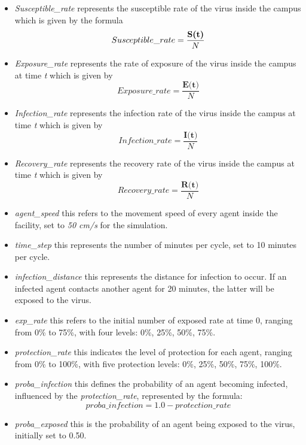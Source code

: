 \begin{itemize}
 	\item \textit{Susceptible\_rate} represents the susceptible rate of the virus inside the campus which is given by the formula
 	\[
 	Susceptible\_rate = \frac{\textbf{\textbf{S(t)}}}{N}
 	\]
 	\item \textit{Exposure\_rate} represents the rate of exposure of the virus inside the campus at time \textit{t} which is given by
 	\[
 	Exposure\_rate = \frac{\textbf{E(t)}}{N}
 	\]
 	\item \textit{Infection\_rate} represents the infection rate of the virus inside the campus at time \textit{t} which is given by
 	\[
 	Infection\_rate = \frac{\textbf{I(t)}}{N}
 	\]
 	\item \textit{Recovery\_rate} represents the recovery rate of the virus inside the campus at time \textit{t} which is given by
 	\begin{equation*}
 		Recovery\_rate = \frac{\textbf{R(t)}}{N}
 	\end{equation*}
 	
 	\item \textit{agent\_speed} this refers to the movement speed of every agent inside the facility, set to \textit{50 cm/s} for the simulation.
 	
 	\item \textit{time\_step} this represents the number of minutes per cycle, set to 10 minutes per cycle.
 	
 	\item \textit{infection\_distance} this represents the distance for infection to occur. If an infected agent contacts another agent for 20 minutes, the latter will be exposed to the virus.
 	
 	\item \textit{exp\_rate} this refers to the initial number of exposed rate at time 0, ranging from 0\% to 75\%, with four levels: 0\%, 25\%, 50\%, 75\%.
 	
 	\item \textit{protection\_rate} this indicates the level of protection for each agent, ranging from 0\% to 100\%, with five protection levels: 0\%, 25\%, 50\%, 75\%, 100\%.
 	
 
 	
 	\item \textit{proba\_infection} this defines the probability of an agent becoming infected, influenced by the \textit{protection\_rate}, represented by the formula:
 	\[
 	proba\_infection = 1.0 - protection\_rate
 	\]
 	
 	\item \textit{proba\_exposed} this is the probability of an agent being exposed to the virus, initially set to 0.50.
 	

\end{itemize}
